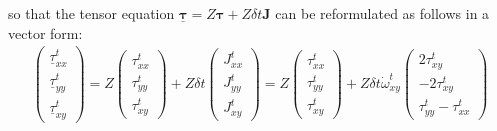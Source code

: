 so that the tensor equation $\underline{\bm \tau}= Z {\bm \tau} + Z \delta t {\bm J}$ can be 
reformulated as follows in a vector form: 
\begin{eqnarray}
\left(
\begin{array}{c}
\underline{\tau}^t_{xx}\\
\underline{\tau}^t_{yy}\\
\underline{\tau}^t_{xy}
\end{array}
\right)
=
Z 
\left(
\begin{array}{c}
{\tau}_{xx}^t\\
{\tau}_{yy}^t\\
{\tau}_{xy}^t
\end{array}
\right)
+ Z \delta t
\left(
\begin{array}{c}
J^t_{xx}\\
J^t_{yy}\\
J^t_{xy}
\end{array}
\right)
=
Z 
\left(
\begin{array}{c}
{\tau}^t_{xx}\\
{\tau}^t_{yy}\\
{\tau}^t_{xy}
\end{array}
\right)
+ Z \delta t
\dot{\omega}^t_{xy}
\left(
\begin{array}{c}
 2\tau^t_{xy} \\
-2\tau^t_{xy} \\
\tau^t_{yy}-\tau^t_{xx} 
\end{array}
\right)
\end{eqnarray}




